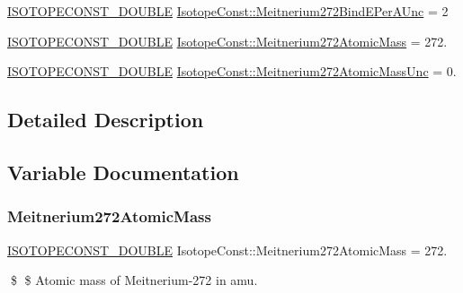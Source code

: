 \begin{DoxyCompactItemize}
\mbox{\hyperlink{group___isotope_const-_macros_ga8f45a7272ce02c0b4c65c44636ed719a}{I\+S\+O\+T\+O\+P\+E\+C\+O\+N\+S\+T\+\_\+\+D\+O\+U\+B\+LE}} \mbox{\hyperlink{group___isotope_const-_meitnerium-_mt272_gaf2376eb94e643ffcca8942f5bbdf507d}{Isotope\+Const\+::\+Meitnerium272\+Bind\+E\+Per\+A\+Unc}} = 2
\item 
\mbox{\hyperlink{group___isotope_const-_macros_ga8f45a7272ce02c0b4c65c44636ed719a}{I\+S\+O\+T\+O\+P\+E\+C\+O\+N\+S\+T\+\_\+\+D\+O\+U\+B\+LE}} \mbox{\hyperlink{group___isotope_const-_meitnerium-_mt272_ga4890831ab21df4a57f4fe92036689d15}{Isotope\+Const\+::\+Meitnerium272\+Atomic\+Mass}} = 272.
\item 
\mbox{\hyperlink{group___isotope_const-_macros_ga8f45a7272ce02c0b4c65c44636ed719a}{I\+S\+O\+T\+O\+P\+E\+C\+O\+N\+S\+T\+\_\+\+D\+O\+U\+B\+LE}} \mbox{\hyperlink{group___isotope_const-_meitnerium-_mt272_ga6810488a9a6a4b9ea1752a6dcf0e0b66}{Isotope\+Const\+::\+Meitnerium272\+Atomic\+Mass\+Unc}} = 0.
\end{DoxyCompactItemize}


\subsection{Detailed Description}


\subsection{Variable Documentation}
\mbox{\label{group___isotope_const-_meitnerium-_mt272_ga4890831ab21df4a57f4fe92036689d15}} 
\subsubsection{\texorpdfstring{Meitnerium272\+Atomic\+Mass}{Meitnerium272AtomicMass}}
{\footnotesize\ttfamily \mbox{\hyperlink{group___isotope_const-_macros_ga8f45a7272ce02c0b4c65c44636ed719a}{I\+S\+O\+T\+O\+P\+E\+C\+O\+N\+S\+T\+\_\+\+D\+O\+U\+B\+LE}} Isotope\+Const\+::\+Meitnerium272\+Atomic\+Mass = 272.}

\$ \$ Atomic mass of Meitnerium-\/272 in amu. \mbox{\label{group___isotope_const-_meitnerium-_mt272_ga6810488a9a6a4b9ea1752a6dcf0e0b66}} 
